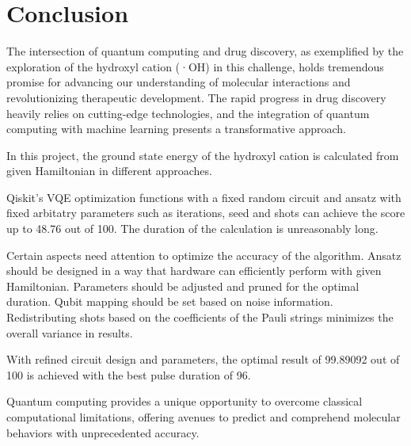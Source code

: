 \documentclass{article}
\begin{document}
\section{Conclusion}
The intersection of quantum computing and drug discovery, as exemplified by the exploration of the hydroxyl cation (·OH) in this challenge, holds tremendous promise for advancing our understanding of molecular interactions and revolutionizing therapeutic development. The rapid progress in drug discovery heavily relies on cutting-edge technologies, and the integration of quantum computing with machine learning presents a transformative approach.

In this project, the ground state energy of the hydroxyl cation is calculated from given Hamiltonian in different approaches. 

Qiskit's VQE optimization functions with a fixed random circuit and ansatz with fixed arbitatry parameters such as iterations, seed and shots can achieve the score up to 48.76 out of 100. The duration of the calculation is unreasonably long. 

Certain aspects need attention to optimize the accuracy of the algorithm. Ansatz should be designed in a way that hardware can efficiently perform with given Hamiltonian. Parameters should be adjusted and pruned for the optimal duration. Qubit mapping should be set based on noise information. Redistributing shots based on the coefficients of the Pauli strings minimizes the overall variance in results. 

With refined circuit design and parameters, the optimal result of 99.89092 out of 100 is achieved with the best pulse duration of 96. 

Quantum computing provides a unique opportunity to overcome classical computational limitations, offering avenues to predict and comprehend molecular behaviors with unprecedented accuracy.


\end{document}
